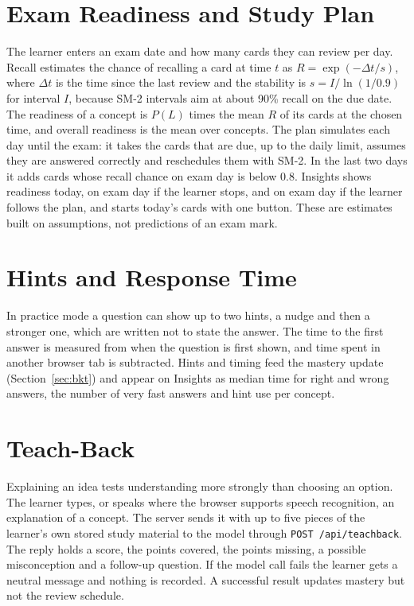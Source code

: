 \section{Exam Readiness and Study Plan}
The learner enters an exam date and how many cards they can review per day. Recall estimates the chance of recalling a card at time $t$ as $R=\exp(-\Delta t/s)$, where $\Delta t$ is the time since the last review and the stability is $s = I/\ln(1/0.9)$ for interval $I$, because SM-2 intervals aim at about 90\% recall on the due date. The readiness of a concept is $P(L)$ times the mean $R$ of its cards at the chosen time, and overall readiness is the mean over concepts. The plan simulates each day until the exam: it takes the cards that are due, up to the daily limit, assumes they are answered correctly and reschedules them with SM-2. In the last two days it adds cards whose recall chance on exam day is below $0.8$. Insights shows readiness today, on exam day if the learner stops, and on exam day if the learner follows the plan, and starts today's cards with one button. These are estimates built on assumptions, not predictions of an exam mark.

\section{Hints and Response Time}
In practice mode a question can show up to two hints, a nudge and then a stronger one, which are written not to state the answer. The time to the first answer is measured from when the question is first shown, and time spent in another browser tab is subtracted. Hints and timing feed the mastery update (Section~\ref{sec:bkt}) and appear on Insights as median time for right and wrong answers, the number of very fast answers and hint use per concept.

\section{Teach-Back}
\label{sec:teachback}
Explaining an idea tests understanding more strongly than choosing an option. The learner types, or speaks where the browser supports speech recognition, an explanation of a concept. The server sends it with up to five pieces of the learner's own stored study material to the model through \texttt{POST /api/teachback}. The reply holds a score, the points covered, the points missing, a possible misconception and a follow-up question. If the model call fails the learner gets a neutral message and nothing is recorded. A successful result updates mastery but not the review schedule.


